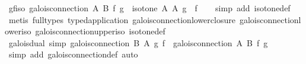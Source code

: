 \begin{isabellebody}
\endisatagproof
{\isafoldproof}%
%
\isadelimproof
\isanewline
%
\endisadelimproof
\isanewline
{}\isamarkupfalse%
\ gf{}iso{}\ {}galois{}connection\ A\ B\ f\ g\ {}\ isotone\ A\ A\ {}g\ {}\ f{}{}\isanewline
%
\isadelimproof
\ \ %
\endisadelimproof
%
\isatagproof
{}\isamarkupfalse%
\ {}simp\ add{}\ isotone{}def{}\isanewline
\ \ \isamarkupfalse%
\ {}metis\ {}full{}types{}\ typed{}application\ galois{}connection{}lower{}closure\ galois{}connection{}lower{}iso\ galois{}connection{}upper{}iso\ isotone{}def{}%
\endisatagproof
{\isafoldproof}%
%
\isadelimproof
\isanewline
%
\endisadelimproof
\isanewline
{}\isamarkupfalse%
\ galois{}dual\ {}simp{}{}\ {}galois{}connection\ {}B{}{}\ {}A{}{}\ g\ f\ {}\ galois{}connection\ A\ B\ f\ g{}\isanewline
%
\isadelimproof
\ \ %
\endisadelimproof
%
\isatagproof
{}\isamarkupfalse%
\ {}simp\ add{}\ galois{}connection{}def{}\ auto{}%

\end{isabellebody}

